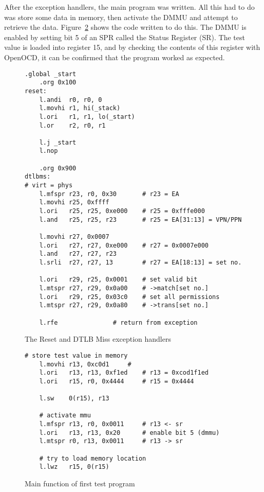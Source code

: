 After the exception handlers, the main program was written. All this had to do was store some data in memory, then activate the DMMU and attempt to retrieve the data. Figure~\ref{fig:mn1} shows the code written to do this. The DMMU is enabled by setting bit 5 of an SPR called the Status Register (SR). The test value is loaded into register 15, and by checking the contents of this register with OpenOCD, it can be confirmed that the program worked as expected.

\begin{figure}[t]
  \centering
  \begin{lstlisting}[language={[x86masm]Assembler}]
	.global _start
	.org 0x100
reset:
	l.andi	r0, r0,	0
	l.movhi	r1, hi(_stack)
	l.ori	r1, r1, lo(_start)
	l.or	r2, r0, r1
	
	l.j	_start
	l.nop

	.org 0x900
dtlbms:
# virt = phys
	l.mfspr	r23, r0, 0x30		# r23 = EA
	l.movhi	r25, 0xffff
	l.ori	r25, r25, 0xe000	# r25 = 0xfffe000
	l.and	r25, r25, r23		# r25 = EA[31:13] = VPN/PPN

	l.movhi	r27, 0x0007
	l.ori	r27, r27, 0xe000	# r27 = 0x0007e000
	l.and	r27, r27, r23
	l.srli	r27, r27, 13		# r27 = EA[18:13] = set no.

	l.ori	r29, r25, 0x0001	# set valid bit
	l.mtspr	r27, r29, 0x0a00	# ->match[set no.]
	l.ori	r29, r25, 0x03c0	# set all permissions
	l.mtspr	r27, r29, 0x0a80	# ->trans[set no.]

	l.rfe				# return from exception
  \end{lstlisting}
  \caption{The Reset and DTLB Miss exception handlers}
  \label{fig:exh}
\end{figure}

\begin{figure}[t]
  \centering
  \begin{lstlisting}[language={[x86masm]Assembler}]
	# store test value in memory
	l.movhi	r13, 0xc0d1		#
	l.ori	r13, r13, 0xf1ed	# r13 = 0xcod1f1ed
	l.ori	r15, r0, 0x4444		# r15 = 0x4444
	
	l.sw	0(r15), r13

	# activate mmu
	l.mfspr	r13, r0, 0x0011		# r13 <- sr
	l.ori	r13, r13, 0x20		# enable bit 5 (dmmu)
	l.mtspr	r0, r13, 0x0011		# r13 -> sr
	
	# try to load memory location
	l.lwz	r15, 0(r15)
	\end{lstlisting}
  \caption{Main function of first test program}
  \label{fig:mn1}
\end{figure}

